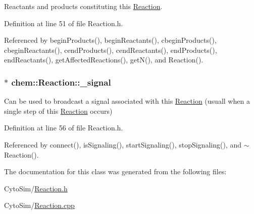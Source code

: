 Reactants and products constituting this \hyperlink{classchem_1_1Reaction}{Reaction}. 



Definition at line 51 of file Reaction.\-h.



Referenced by begin\-Products(), begin\-Reactants(), cbegin\-Products(), cbegin\-Reactants(), cend\-Products(), cend\-Reactants(), end\-Products(), end\-Reactants(), get\-Affected\-Reactions(), get\-N(), and Reaction().

\hypertarget{classchem_1_1Reaction_a55ca3408f31e6074775d6a8cb2a6b95b}{
\subsubsection[{\-\_\-signal}]{$\ast$ {\bf chem\-::\-Reaction\-::\-\_\-signal}}}\label{classchem_1_1Reaction_a55ca3408f31e6074775d6a8cb2a6b95b}


Can be used to broadcast a signal associated with this \hyperlink{classchem_1_1Reaction}{Reaction} (usuall when a single step of this \hyperlink{classchem_1_1Reaction}{Reaction} occurs) 



Definition at line 56 of file Reaction.\-h.



Referenced by connect(), is\-Signaling(), start\-Signaling(), stop\-Signaling(), and $\sim$\-Reaction().



The documentation for this class was generated from the following files\-:\begin{DoxyCompactItemize}
\item 
Cyto\-Sim/\hyperlink{Reaction_8h}{Reaction.\-h}\item 
Cyto\-Sim/\hyperlink{Reaction_8cpp}{Reaction.\-cpp}\end{DoxyCompactItemize}

